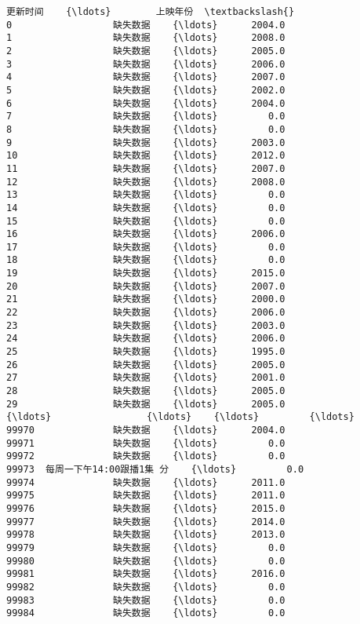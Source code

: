 \documentclass[11pt]{article}
\begin{document}
\begin{Verbatim}[commandchars=\\\{\}]
                   更新时间    {\ldots}        上映年份  \textbackslash{}
0                  缺失数据    {\ldots}      2004.0   
1                  缺失数据    {\ldots}      2008.0   
2                  缺失数据    {\ldots}      2005.0   
3                  缺失数据    {\ldots}      2006.0   
4                  缺失数据    {\ldots}      2007.0   
5                  缺失数据    {\ldots}      2002.0   
6                  缺失数据    {\ldots}      2004.0   
7                  缺失数据    {\ldots}         0.0   
8                  缺失数据    {\ldots}         0.0   
9                  缺失数据    {\ldots}      2003.0   
10                 缺失数据    {\ldots}      2012.0   
11                 缺失数据    {\ldots}      2007.0   
12                 缺失数据    {\ldots}      2008.0   
13                 缺失数据    {\ldots}         0.0   
14                 缺失数据    {\ldots}         0.0   
15                 缺失数据    {\ldots}         0.0   
16                 缺失数据    {\ldots}      2006.0   
17                 缺失数据    {\ldots}         0.0   
18                 缺失数据    {\ldots}         0.0   
19                 缺失数据    {\ldots}      2015.0   
20                 缺失数据    {\ldots}      2007.0   
21                 缺失数据    {\ldots}      2000.0   
22                 缺失数据    {\ldots}      2006.0   
23                 缺失数据    {\ldots}      2003.0   
24                 缺失数据    {\ldots}      2006.0   
25                 缺失数据    {\ldots}      1995.0   
26                 缺失数据    {\ldots}      2005.0   
27                 缺失数据    {\ldots}      2001.0   
28                 缺失数据    {\ldots}      2005.0   
29                 缺失数据    {\ldots}      2005.0   
{\ldots}                 {\ldots}    {\ldots}         {\ldots}   
99970              缺失数据    {\ldots}      2004.0   
99971              缺失数据    {\ldots}         0.0   
99972              缺失数据    {\ldots}         0.0   
99973  每周一下午14:00跟播1集 分    {\ldots}         0.0   
99974              缺失数据    {\ldots}      2011.0   
99975              缺失数据    {\ldots}      2011.0   
99976              缺失数据    {\ldots}      2015.0   
99977              缺失数据    {\ldots}      2014.0   
99978              缺失数据    {\ldots}      2013.0   
99979              缺失数据    {\ldots}         0.0   
99980              缺失数据    {\ldots}         0.0   
99981              缺失数据    {\ldots}      2016.0   
99982              缺失数据    {\ldots}         0.0   
99983              缺失数据    {\ldots}         0.0   
99984              缺失数据    {\ldots}         0.0   

\end{Verbatim}
\end{document}
